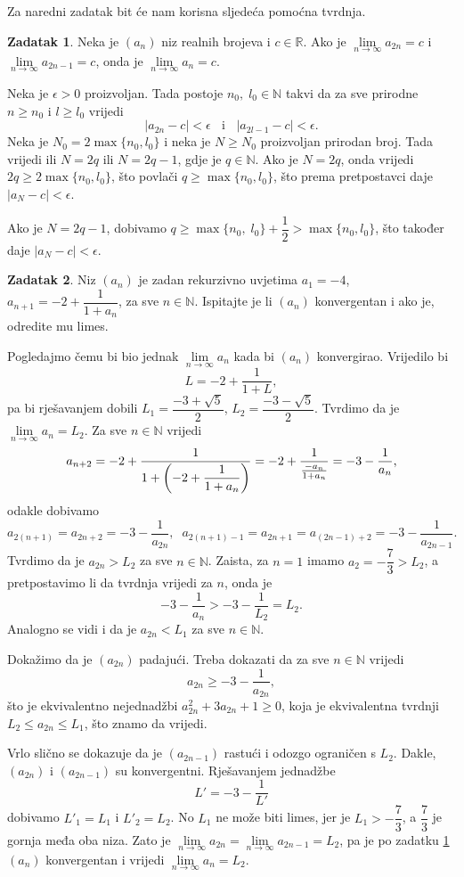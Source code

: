 \documentclass{book}
\let\originalleft\left
\let\originalright\right
\renewcommand{\left}{\mathopen{}\mathclose\bgroup\originalleft}
\renewcommand{\right}{\aftergroup\egroup\originalright}
\renewenvironment{proof}{%
    \vspace{-\parskip}\begin{oldproof}%
    }{%
    \end{oldproof}%
}
\theoremstyle{definition}
\theoremstyle{definition}
\newtheorem{exercise}{Zadatak}
\theoremstyle{remark}
\begin{document}
Za naredni zadatak bit će nam korisna sljedeća pomoćna tvrdnja.
\begin{exercise}
\label{subsequencelemma}
Neka je $(a_n)$ niz realnih brojeva i $c\in \mathbb{R}$. Ako je $\lim\limits_{n\to \infty}{a_{2n}}=c$ i $\lim\limits_{n\to \infty}{a_{2n-1}}=c$, onda je $\lim\limits_{n\to \infty}{a_{n}}=c$.
\end{exercise}
\begin{proof}[Rješenje]
Neka je $\epsilon>0$ proizvoljan. Tada postoje $n_0,\; l_0\in \mathbb{N}$ takvi da za sve prirodne $n\geq n_0$ i $l\geq l_0$ vrijedi 
$$|a_{2n}-c|<\epsilon\;\;\text{ i }\;\;|a_{2l-1}-c|<\epsilon.$$ 
Neka je $N_0=2\max\{n_0, l_0\}$ i neka je $N\geq N_0$ proizvoljan prirodan broj. Tada vrijedi ili $N=2q$ ili $N=2q-1$, gdje je $q\in \mathbb{N}$. Ako je $N=2q$, onda vrijedi $2q\geq 2\max\{n_0, l_0\}$, što povlači $q\geq \max\{n_0, l_0\}$, što prema pretpostavci daje $|a_N-c|<\epsilon$. 

Ako je $N=2q-1$, dobivamo $q\geq \max\{n_0,\; l_0\}+\dfrac{1}{2}>\max\{n_0, l_0\}$, što također daje $|a_N-c|<\epsilon$.
\end{proof}
\begin{exercise}
\label{38}
Niz $(a_n)$ je zadan rekurzivno uvjetima $a_1=-4$, $a_{n+1}=-2+\dfrac{1}{1+a_n}$, za sve $n\in \mathbb{N}$. Ispitajte je li $(a_n)$ konvergentan i ako je, odredite mu limes.
\end{exercise}
\begin{proof}[Rješenje]
Pogledajmo čemu bi bio jednak $\lim\limits_{n\to \infty}{a_n}$ kada bi $(a_n)$ konvergirao. Vrijedilo bi
$$L=-2+\dfrac{1}{1+L},$$
pa bi rješavanjem dobili $L_1=\dfrac{-3+\sqrt{5}}{2}$, $L_2=\dfrac{-3-\sqrt{5}}{2}$. Tvrdimo da je $\lim\limits_{n\to \infty}{a_n}=L_2$.
Za sve $n\in \mathbb{N}$ vrijedi
$$a_{n+2}=-2+\dfrac{1}{1+\left(-2+\dfrac{1}{1+a_n}\right)}=-2+\dfrac{1}{\frac{-a_n}{1+a_n}}=-3-\dfrac{1}{a_n},$$
odakle dobivamo
$$a_{2(n+1)}=a_{2n+2}=-3-\dfrac{1}{a_{2n}},\;\; a_{2(n+1)-1}=a_{2n+1}=a_{(2n-1)+2}=-3-\dfrac{1}{a_{2n-1}}.$$
Tvrdimo da je $a_{2n}> L_2$ za sve $n\in \mathbb{N}$. Zaista, za $n=1$ imamo $a_2=-\dfrac{7}{3}>L_2$, a pretpostavimo li da tvrdnja vrijedi za $n$, onda je
$$-3-\dfrac{1}{a_n}>-3-\dfrac{1}{L_2}=L_2.$$
Analogno se vidi i da je $a_{2n}< L_1$ za sve $n\in \mathbb{N}$.

Dokažimo da je $(a_{2n})$ padajući. Treba dokazati da za sve $n\in \mathbb{N}$ vrijedi
$$a_{2n}\geq -3-\dfrac{1}{a_{2n}},$$
što je ekvivalentno nejednadžbi $a_{2n}^2+3a_{2n}+1\geq 0$, koja je ekvivalentna tvrdnji $L_2\leq a_{2n}\leq L_1$, što znamo da vrijedi.

Vrlo slično se dokazuje da je $(a_{2n-1})$ rastući i odozgo ograničen s $L_2$. Dakle, $(a_{2n})$ i $(a_{2n-1})$ su konvergentni. Rješavanjem jednadžbe
$$L'=-3-\dfrac{1}{L'}$$
dobivamo $L'_1=L_1$ i $L'_2=L_2$. No $L_1$ ne može biti limes, jer je $L_1>-\dfrac{7}{3}$, a $\dfrac{7}{3}$ je gornja međa oba niza. Zato je $\lim\limits_{n\to \infty}{a_{2n}}=\lim\limits_{n\to \infty}{a_{2n-1}}=L_2$, pa je po zadatku \ref{subsequencelemma} $(a_n)$ konvergentan i vrijedi $\lim\limits_{n\to \infty}{a_{n}}=L_2$.
\end{proof}
\end{document}
